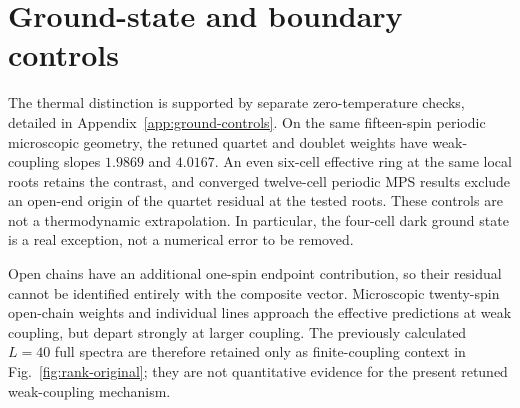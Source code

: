\section{Ground-state and boundary controls}

The thermal distinction is supported by separate zero-temperature checks,
detailed in Appendix~\ref{app:ground-controls}. On the same fifteen-spin
periodic microscopic geometry, the retuned quartet and doublet weights
have weak-coupling slopes $1.9869$ and $4.0167$. An even six-cell effective
ring at the same local roots retains the contrast, and converged
twelve-cell periodic MPS results exclude an open-end origin of the
quartet residual at the tested roots. These controls are not a
thermodynamic extrapolation. In particular, the four-cell dark ground
state is a real exception, not a numerical error to be removed.

Open chains have an additional one-spin endpoint contribution, so their
residual cannot be identified entirely with the composite vector.
Microscopic twenty-spin open-chain weights and individual lines approach
the effective predictions at weak coupling, but depart strongly at larger
coupling. The previously calculated $L=40$ full spectra are therefore
retained only as finite-coupling context in
Fig.~\ref{fig:rank-original}; they are not quantitative evidence for the
present retuned weak-coupling mechanism.
